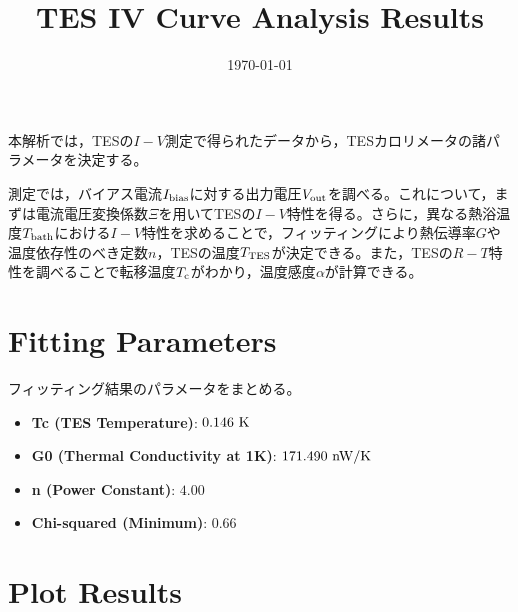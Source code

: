 \documentclass[platex,dvipdfmx,10pt,twoside,a4paper,jis2004]{jsarticle}
\title{TES IV Curve Analysis Results}
\author{}
\date{\today}
\begin{document}
\maketitle
本解析では，TESの$I-V$測定で得られたデータから，TESカロリメータの諸パラメータを決定する。
\par
測定では，バイアス電流$I_{\rm bias}$に対する出力電圧$V_{\rm out}$を調べる。これについて，まずは電流電圧変換係数$\Xi$を用いてTESの$I-V$特性を得る。さらに，異なる熱浴温度$T_{\rm bath}$における$I-V$特性を求めることで，フィッティングにより熱伝導率$G$や温度依存性のべき定数$n$，TESの温度$T_{\rm TES}$が決定できる。また，TESの$R-T$特性を調べることで転移温度$T_{\rm c}$がわかり，温度感度$\alpha$が計算できる。

\section*{Fitting Parameters}
フィッティング結果のパラメータをまとめる。
\begin{itemize}
    \item \textbf{Tc (TES Temperature)}: $0.146\ {\rm K}$
    \item \textbf{G0 (Thermal Conductivity at 1K)}: $171.490\ {\rm nW/K}$
    \item \textbf{n (Power Constant)}: $4.00$
    \item \textbf{Chi-squared (Minimum)}: $0.66$
\end{itemize}
\clearpage

\section*{Plot Results}
\end{document}

